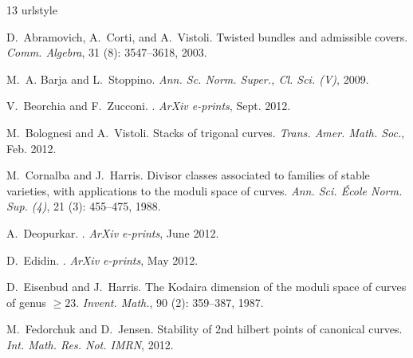 \documentclass{amsart}
\begin{document}
\begin{thebibliography}{13}
\providecommand{\natexlab}[1]{#1}
\providecommand{\url}[1]{\texttt{#1}}
\expandafter\ifx\csname urlstyle\endcsname\relax
  \providecommand{\doi}[1]{doi: #1}\else
  \providecommand{\doi}{doi: \begingroup \urlstyle{rm}\Url}\fi

D.~Abramovich, A.~Corti, and A.~Vistoli.
\newblock Twisted bundles and admissible covers.
\newblock \emph{Comm. Algebra}, 31 (8): 3547--3618, 2003.

M.~A. Barja and L.~Stoppino.
\newblock \emph{{Ann. Sc. Norm. Super., Cl. Sci. (V)}}, 2009.

V.~{Beorchia} and F.~{Zucconi}.
.
\newblock \emph{ArXiv e-prints}, Sept. 2012.

M.~Bolognesi and A.~Vistoli.
\newblock Stacks of trigonal curves.
\newblock \emph{Trans. Amer. Math. Soc.}, Feb. 2012.

M.~Cornalba and J.~Harris.
\newblock Divisor classes associated to families of stable varieties, with
  applications to the moduli space of curves.
\newblock \emph{Ann. Sci. \'Ecole Norm. Sup. (4)}, 21 (3):
  455--475, 1988.

A.~{Deopurkar}.
.
\newblock \emph{ArXiv e-prints}, June 2012.

D.~{Edidin}.
.
\newblock \emph{ArXiv e-prints}, May 2012.

D.~Eisenbud and J.~Harris.
\newblock The {K}odaira dimension of the moduli space of curves of genus {$\geq
  23$}.
\newblock \emph{Invent. Math.}, 90 (2): 359--387, 1987.

M.~Fedorchuk and D.~Jensen.
\newblock Stability of 2nd hilbert points of canonical curves.
\newblock \emph{Int. Math. Res. Not. IMRN}, 2012.


\end{thebibliography}
\end{document}
